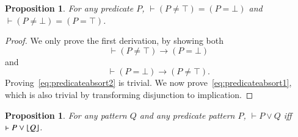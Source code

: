 \documentclass{article}
\theoremstyle{plain}
\newtheorem{prop}[thm]{Proposition}
\DeclarePairedDelimiter\floor{\lfloor}{\rfloor}
\begin{document}
\begin{prop} \label{prop:predicateabsorb}
For any predicate $P$, $\vdash (P \neq \top) = (P = \bot)$ and $\vdash (P \neq \bot) = (P = \top)$.
\end{prop}
\begin{proof}
We only prove the first derivation, by showing both
\begin{equation}\label{eq:predicateabsort1}
\vdash (P \neq \top) \to (P = \bot)
\end{equation}
and
\begin{equation}\label{eq:predicateabsort2}
\vdash (P = \bot) \to (P \neq \top).
\end{equation}
Proving~\eqref{eq:predicateabsort2} is trivial. We now prove~\eqref{eq:predicateabsort1}, which is also trivial by transforming disjunction to implication.
\end{proof}
\begin{prop} \label{prop:predicatevee}
For any pattern $Q$ and any predicate pattern $P$, $\vdash P \vee Q$ iff $\vdash P \vee \floor*{Q}$.
\end{prop}
\end{document}
